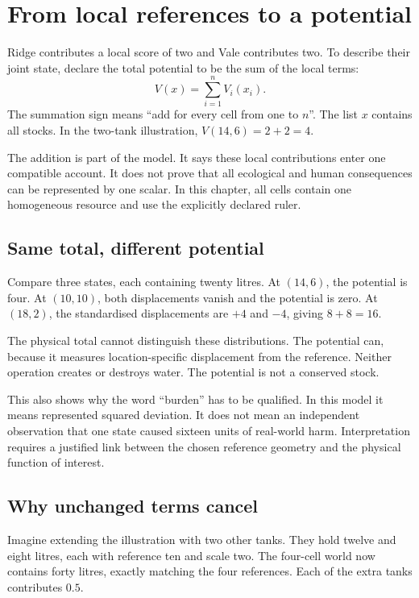 \chapter{From local references to a potential}\label{ch:potential}

Ridge contributes a local score of two and Vale contributes two. To describe their joint state, declare the total potential to be the sum of the local terms:
\begin{equation}\label{eq:potential}
 V(x)=\sum_{i=1}^{n}V_i(x_i).
\end{equation}
The summation sign means ``add for every cell from one to $n$''. The list $x$ contains all stocks. In the two-tank illustration, $V(14,6)=2+2=4$.

The addition is part of the model. It says these local contributions enter one compatible account. It does not prove that all ecological and human consequences can be represented by one scalar. In this chapter, all cells contain one homogeneous resource and use the explicitly declared ruler.

\section{Same total, different potential}
Compare three states, each containing twenty litres. At $(14,6)$, the potential is four. At $(10,10)$, both displacements vanish and the potential is zero. At $(18,2)$, the standardised displacements are $+4$ and $-4$, giving $8+8=16$.

The physical total cannot distinguish these distributions. The potential can, because it measures location-specific displacement from the reference. Neither operation creates or destroys water. The potential is not a conserved stock.

This also shows why the word ``burden'' has to be qualified. In this model it means represented squared deviation. It does not mean an independent observation that one state caused sixteen units of real-world harm. Interpretation requires a justified link between the chosen reference geometry and the physical function of interest.

\section{Why unchanged terms cancel}
Imagine extending the illustration with two other tanks. They hold twelve and eight litres, each with reference ten and scale two. The four-cell world now contains forty litres, exactly matching the four references. Each of the extra tanks contributes $0.5$.

